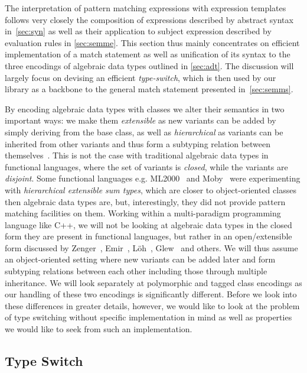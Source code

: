 \documentclass[preprint]{sigplanconf}
\begin{document}
The interpretation of pattern matching expressions with expression templates follows 
very closely the composition of expressions described by abstract syntax 
in~\textsection\ref{sec:syn} as well as their application to subject expression 
described by evaluation rules in \textsection\ref{sec:semme}. This section thus
mainly concentrates on efficient implementation of a match statement as 
well as unification of its syntax to the three encodings of algebraic data types
outlined in \textsection\ref{sec:adt}. The discussion will largely focus on 
devising an efficient \emph{type-switch}, which is then used by our library as a 
backbone to the general match statement presented in~\textsection\ref{sec:semms}. 

By encoding algebraic data types with classes we alter their semantics in two 
important ways: we make them \emph{extensible} as new variants can be added by 
simply deriving from the base class, as well as \emph{hierarchical} as variants 
can be inherited from other variants and thus form a subtyping relation between 
themselves~\cite{Glew99}. This is not the case with traditional algebraic data 
types in functional languages, where the set of variants is \emph{closed}, while 
the variants are \emph{disjoint}. Some functional languages e.g. 
ML2000~\cite{ML2000} and Moby~\cite{Moby} were experimenting with 
\emph{hierarchical extensible sum types}, which are closer to object-oriented 
classes then algebraic data types are, but, interestingly, they did not provide 
pattern matching facilities on them. Working within a multi-paradigm  
programming language like C++, we will not be looking at algebraic data types in
the closed form they are present in functional languages, but rather in an 
open/extensible form discussed by Zenger~\cite{Zenger:2001}, Emir~\cite{EmirThesis}, 
L\"oh~\cite{LohHinze2006}, Glew~\cite{Glew99} and others. We will thus 
assume an object-oriented setting where new variants can be added later and form
subtyping relations between each other including those through multiple 
inheritance. We will look separately at polymorphic and tagged class encodings 
as our handling of these two encodings is significantly different. Before we 
look into these differences in greater details, however, we would like to look 
at the problem of type switching without specific implementation in mind as well 
as properties we would like to seek from such an implementation.

\subsection{Type Switch}
\end{document}
